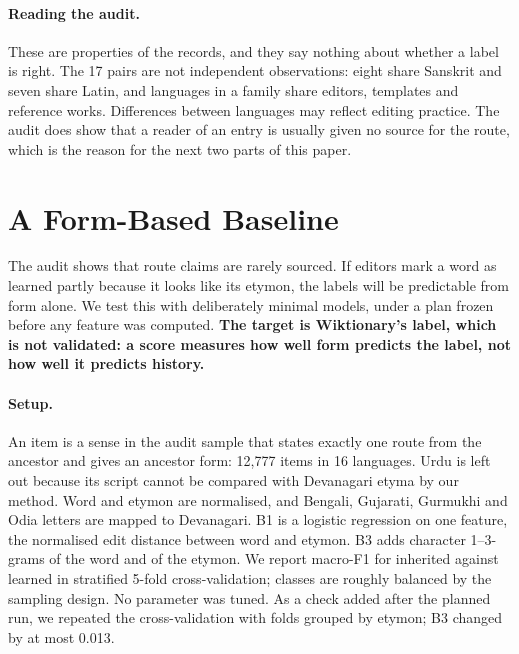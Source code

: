 \documentclass[11pt]{article}
\begin{document}
\paragraph{Reading the audit.} These are properties of the records, and they say nothing about whether a label is right. The 17 pairs are not independent observations: eight share Sanskrit and seven share Latin, and languages in a family share editors, templates and reference works. Differences between languages may reflect editing practice. The audit does show that a reader of an entry is usually given no source for the route, which is the reason for the next two parts of this paper.

\section{A Form-Based Baseline}
\label{sec:baseline}

The audit shows that route claims are rarely sourced. If editors mark a word as learned partly because it looks like its etymon, the labels will be predictable from form alone. We test this with deliberately minimal models, under a plan frozen before any feature was computed. \textbf{The target is Wiktionary's label, which is not validated: a score measures how well form predicts the label, not how well it predicts history.}

\paragraph{Setup.} An item is a sense in the audit sample that states exactly one route from the ancestor and gives an ancestor form: 12,777 items in 16 languages. Urdu is left out because its script cannot be compared with Devanagari etyma by our method. Word and etymon are normalised, and Bengali, Gujarati, Gurmukhi and Odia letters are mapped to Devanagari. B1 is a logistic regression on one feature, the normalised edit distance between word and etymon. B3 adds character 1--3-grams of the word and of the etymon. We report macro-F1 for inherited against learned in stratified 5-fold cross-validation; classes are roughly balanced by the sampling design. No parameter was tuned. As a check added after the planned run, we repeated the cross-validation with folds grouped by etymon; B3 changed by at most 0.013.
\end{document}
